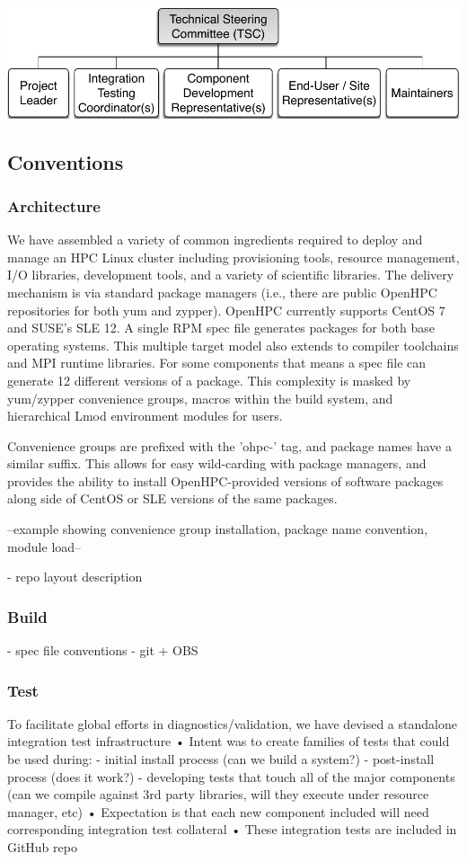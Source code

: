 \documentclass{sig-alternate-05-2015}
\begin{document}
\includegraphics[width=1.0\linewidth]{figures/governance}

\subsection{Conventions}
\subsubsection{Architecture}
We have assembled a variety of common ingredients required to deploy and manage 
an HPC Linux cluster including provisioning tools, resource management, I/O 
libraries, development tools, and a variety of scientific libraries. The 
delivery mechanism is via standard package managers (i.e., there are public 
OpenHPC repositories for both yum and zypper). OpenHPC currently supports CentOS
7 and SUSE's SLE 12. A single RPM spec file generates packages for both base
operating systems. This multiple target model also extends to compiler
toolchains and MPI runtime libraries. For some components that means a spec file
can generate 12 different versions of a package. This complexity is masked by
yum/zypper convenience groups, macros within the build system, and hierarchical 
Lmod environment modules for users.

Convenience groups are prefixed with the 'ohpc-' tag, and package names have a
similar suffix. This allows for easy wild-carding with package managers, and
provides the ability to install OpenHPC-provided versions of software packages
along side of CentOS or SLE versions of the same packages.

--example showing convenience group installation, package name convention, module
load--

 - repo layout description

\subsubsection{Build}

 - spec file conventions
 - git + OBS
 
\subsubsection{Test}
 To facilitate global efforts in diagnostics/validation, we have devised a standalone integration test infrastructure
 • Intent was to create families of tests that could be used during:
 - initial install process (can we build a system?)
 - post-install process (does it work?)
 - developing tests that touch all of the major components (can we compile against 3rd party libraries, will they execute under resource manager, etc)
 • Expectation is that each new component included will need corresponding integration test collateral
 • These integration tests are included in GitHub repo
\end{document}
